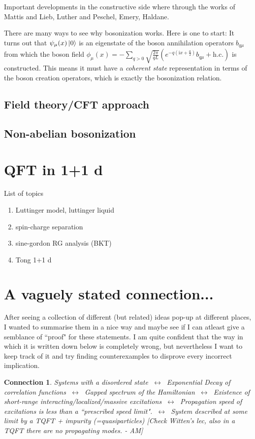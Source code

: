 \documentclass{article}
\newcommand\AM[1]{{\it \color{darkblue}  [#1 - AM]}}
\newtheorem{conn}{Connection}
\renewcommand{\i}{\mathrm{i}}
\renewcommand{\i}{\mathrm{i}}
\begin{document}
Important developments in the constructive side where through the works of Mattis and Lieb, Luther and Peschel, Emery, Haldane.

There are many ways to see why bosonization works. Here is one to start: It turns out that $\psi_{\mu} (x) \ket{0}$ is an eigenstate of the boson annihilation operators $b_{q\mu}$ from which the boson field $\phi_{\mu} (x) = - \sum_{q>0} \sqrt{\frac{2\pi}{qL}}\left(e^{-q(\i x + \frac{a}{2})} b_{q\mu} + \text{h.c.} \right)$ is constructed. This means it must have a \emph{coherent state} representation in terms of the boson creation operators, which is exactly the bosonization relation.

\subsection{Field theory/CFT approach}
\subsection{Non-abelian bosonization}
\section{QFT in 1+1 d}
List of topics
\begin{enumerate}
    \item Luttinger model, luttinger liquid
    \item spin-charge separation
    \item sine-gordon RG analysis (BKT)
    \item Tong 1+1 d
\end{enumerate}
\section{A vaguely stated connection...}
After seeing a collection of different (but related) ideas pop-up at different places, I wanted to summarise them in a nice way and maybe see if I can atleast give a semblance of ``proof" for these statements. I am quite confident that the way in which it is written down below is completely wrong, but nevertheless I want to keep track of it and try finding counterexamples to disprove every incorrect implication.

\begin{conn}
    Systems with a disordered state $~\longleftrightarrow~$ Exponential Decay of correlation functions 
    $~\longleftrightarrow~$ Gapped spectrum of the Hamiltonian
    $~\longleftrightarrow~$ Existence of short-range interacting/localized/massive excitations
    $~\longleftrightarrow~$ Propagation speed of excitations is less than a ``prescribed speed limit".
    $~\longleftrightarrow~$ System described at some limit by a TQFT + impurity (=quasiparticles) \AM{Check Witten's lec, also in a TQFT there are no propagating modes.}
\end{conn}
\end{document}

